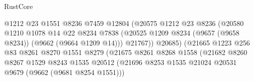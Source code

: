 \begin{lexlean}{RustCore}
\begin{coremodule}
                                          @1212
                                          @23
                                          @1551
                                          @8236
                                          @7459
                                          @12804
                                          (@20575
                                            @1212
                                            @23
                                            @8236
                                            (@20580
                                              @1210
                                              @1078
                                              @14
                                              @22
                                              @8234
                                              @7838
                                              (@20525
                                                @1209
                                                @8234
                                                (@9657 (@9658 @8234))
                                                (@9662 (@9664 @1209 @14)))
                                              @21767))
                                          @20685)
                                        (@21665
                                          @1223
                                          @256
                                          @83
                                          @8261
                                          @8270
                                          @1551
                                          @8279
                                          (@21675
                                            @8261
                                            @8268
                                            @1558
                                            (@21682
                                              @8260
                                              @8267
                                              @1529
                                              @8243
                                              @1535
                                              @20512
                                              (@21696
                                                @8253
                                                @1535
                                                @21024
                                                @20531
                                                @9679
                                                (@9662 (@9681 @8254 @1551)))

\end{coremodule}
\end{lexlean}
